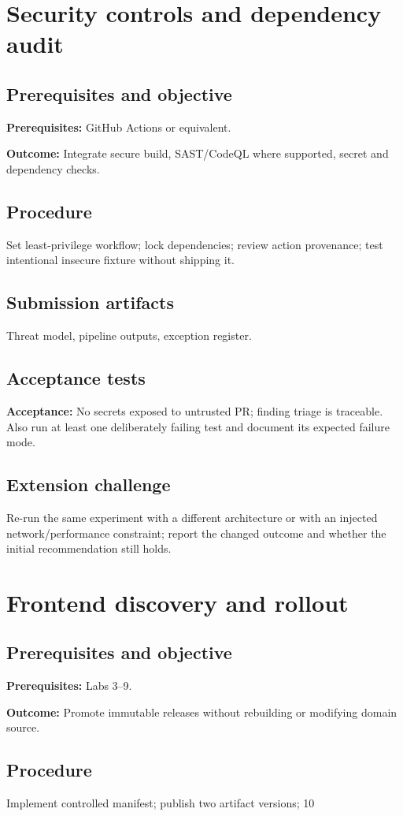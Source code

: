 \documentclass[11pt,letterpaper,oneside]{report}
\newcommand{\criterion}[1]{\textbf{Acceptance:} #1}
\begin{document}
\chapter{Security controls and dependency audit}
\section{Prerequisites and objective}
\textbf{Prerequisites:} GitHub Actions or equivalent.\par
\textbf{Outcome:} Integrate secure build, SAST/CodeQL where supported, secret and dependency checks.
\section{Procedure}
Set least-privilege workflow; lock dependencies; review action provenance; test intentional insecure fixture without shipping it.
\section{Submission artifacts}
Threat model, pipeline outputs, exception register.
\section{Acceptance tests}
\criterion{No secrets exposed to untrusted PR; finding triage is traceable.} Also run at least one deliberately failing test and document its expected failure mode.
\section{Extension challenge}
Re-run the same experiment with a different architecture or with an injected network/performance constraint; report the changed outcome and whether the initial recommendation still holds.

\chapter{Frontend discovery and rollout}
\section{Prerequisites and objective}
\textbf{Prerequisites:} Labs 3--9.\par
\textbf{Outcome:} Promote immutable releases without rebuilding or modifying domain source.
\section{Procedure}
Implement controlled manifest; publish two artifact versions; 10%
\end{document}
